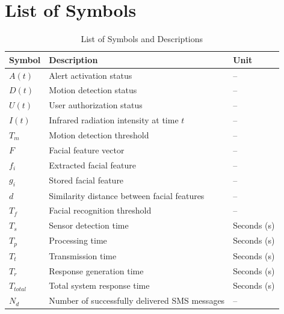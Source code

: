 \documentclass[12pt,a4paper,oneside]{report}
\begin{document}
\clearpage
\chapter*{List of Symbols}

\begin{table}[htbp]
  \centering
  \caption{List of Symbols and Descriptions}
  {\small
  \begin{tabular}{|p{2.50cm}|p{8.00cm}|p{3.21cm}|}
    \hline
    \textbf{Symbol} & \textbf{Description} & \textbf{Unit} \\
    \hline
    $A(t)$        & Alert activation status                          & -- \\
    $D(t)$        & Motion detection status                          & -- \\
    $U(t)$        & User authorization status                        & -- \\
    $I(t)$        & Infrared radiation intensity at time $t$         & -- \\
    $T_m$         & Motion detection threshold                       & -- \\
    $F$           & Facial feature vector                            & -- \\
    $f_i$         & Extracted facial feature                         & -- \\
    $g_i$         & Stored facial feature                            & -- \\
    $d$           & Similarity distance between facial features      & -- \\
    $T_f$         & Facial recognition threshold                     & -- \\
    $T_s$         & Sensor detection time                            & Seconds (s) \\
    $T_p$         & Processing time                                  & Seconds (s) \\
    $T_t$         & Transmission time                                & Seconds (s) \\
    $T_r$         & Response generation time                         & Seconds (s) \\
    $T_{total}$   & Total system response time                       & Seconds (s) \\
    $N_d$         & Number of successfully delivered SMS messages    & -- \\

\end{tabular}}
\end{table}
\end{document}
